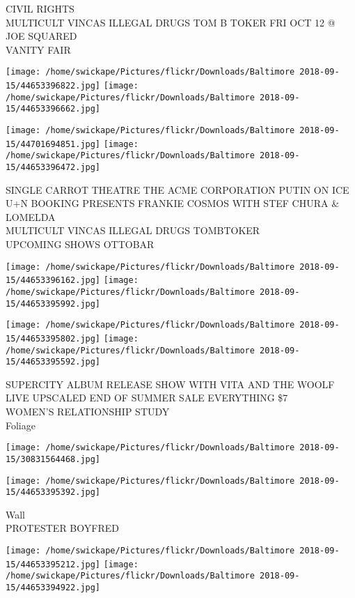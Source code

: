 \documentclass[10pt,letterpaper]{article}
\begin{document}
CIVIL RIGHTS\\
MULTICULT VINCAS ILLEGAL DRUGS TOM B TOKER FRI OCT 12 @ JOE SQUARED\\
VANITY FAIR
\pagebreak

\texttt{[image: /home/swickape/Pictures/flickr/Downloads/Baltimore 2018-09-15/44653396822.jpg]}
\texttt{[image: /home/swickape/Pictures/flickr/Downloads/Baltimore 2018-09-15/44653396662.jpg]}

\texttt{[image: /home/swickape/Pictures/flickr/Downloads/Baltimore 2018-09-15/44701694851.jpg]}
\texttt{[image: /home/swickape/Pictures/flickr/Downloads/Baltimore 2018-09-15/44653396472.jpg]}

SINGLE CARROT THEATRE THE ACME CORPORATION PUTIN ON ICE\\
U+N BOOKING PRESENTS FRANKIE COSMOS WITH STEF CHURA \& LOMELDA\\
MULTICULT VINCAS ILLEGAL DRUGS TOMBTOKER\\
UPCOMING SHOWS OTTOBAR
\pagebreak

\texttt{[image: /home/swickape/Pictures/flickr/Downloads/Baltimore 2018-09-15/44653396162.jpg]}
\texttt{[image: /home/swickape/Pictures/flickr/Downloads/Baltimore 2018-09-15/44653395992.jpg]}

\texttt{[image: /home/swickape/Pictures/flickr/Downloads/Baltimore 2018-09-15/44653395802.jpg]}
\texttt{[image: /home/swickape/Pictures/flickr/Downloads/Baltimore 2018-09-15/44653395592.jpg]}

SUPERCITY ALBUM RELEASE SHOW WITH VITA AND THE WOOLF\\
LIVE UPSCALED END OF SUMMER SALE EVERYTHING \$7\\
WOMEN'S RELATIONSHIP STUDY\\
Foliage
\pagebreak

\texttt{[image: /home/swickape/Pictures/flickr/Downloads/Baltimore 2018-09-15/30831564468.jpg]}

\vspace{0.25in}
\texttt{[image: /home/swickape/Pictures/flickr/Downloads/Baltimore 2018-09-15/44653395392.jpg]}

Wall\\
PROTESTER BOYFRED
\pagebreak

\texttt{[image: /home/swickape/Pictures/flickr/Downloads/Baltimore 2018-09-15/44653395212.jpg]}
\texttt{[image: /home/swickape/Pictures/flickr/Downloads/Baltimore 2018-09-15/44653394922.jpg]}
\end{document}
